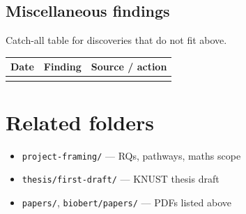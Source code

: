 \documentclass[11pt,a4paper]{article}
\begin{document}
\subsection*{Miscellaneous findings}
Catch-all table for discoveries that do not fit above.

\begin{tabular}{@{}llp{6cm}@{}}
\toprule
Date & Finding & Source / action \\
\midrule
 &  &  \\
\bottomrule
\end{tabular}

\section*{Related folders}
\begin{itemize}
  \item \texttt{project-framing/} --- RQs, pathways, maths scope
  \item \texttt{thesis/first-draft/} --- KNUST thesis draft
  \item \texttt{papers/}, \texttt{biobert/papers/} --- PDFs listed above
\end{itemize}
\end{document}
